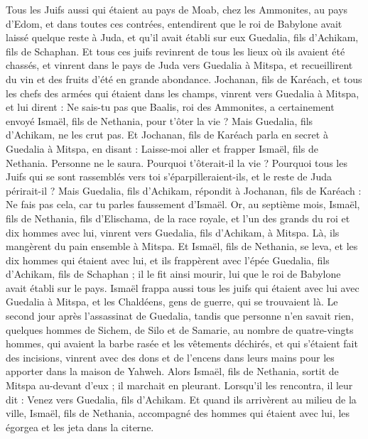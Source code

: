 \begin{multicols}{2}
Tous les Juifs aussi qui étaient au pays de Moab, chez les Ammonites, au pays d’Edom, et dans toutes ces contrées, entendirent que le roi de Babylone avait laissé quelque reste à Juda, et qu'il avait établi sur eux Guedalia, fils d'Achikam, fils de Schaphan.
Et tous ces juifs revinrent de tous les lieux où ils avaient été chassés, et vinrent dans le pays de Juda vers Guedalia à Mitspa, et recueillirent du vin et des fruits d’été en grande abondance.
Jochanan, fils de Karéach, et tous les chefs des armées qui étaient dans les champs, vinrent vers Guedalia à Mitspa,
et lui dirent : Ne sais-tu pas que Baalis, roi des Ammonites, a certainement envoyé Ismaël, fils de Nethania, pour t'ôter la vie ? Mais Guedalia, fils d'Achikam, ne les crut pas.
Et Jochanan, fils de Karéach parla en secret à Guedalia à Mitspa, en disant : Laisse-moi aller et frapper Ismaël, fils de Nethania. Personne ne le saura. Pourquoi t'ôterait-il la vie ? Pourquoi tous les Juifs qui se sont rassemblés vers toi s’éparpilleraient-ils, et le reste de Juda périrait-il ?
Mais Guedalia, fils d'Achikam, répondit à Jochanan, fils de Karéach : Ne fais pas cela, car tu parles faussement d'Ismaël.
\VerseOne{}Or, au septième mois, Ismaël, fils de Nethania, fils d'Elischama, de la race royale, et l'un des grands du roi et dix hommes avec lui, vinrent vers Guedalia, fils d'Achikam, à Mitspa. Là, ils mangèrent du pain ensemble à Mitspa.
Et Ismaël, fils de Nethania, se leva, et les dix hommes qui étaient avec lui, et ils frappèrent avec l'épée Guedalia, fils d'Achikam, fils de Schaphan ; il le fit ainsi mourir, lui que le roi de Babylone avait établi sur le pays.
Ismaël frappa aussi tous les juifs qui étaient avec lui avec Guedalia à Mitspa, et les Chaldéens, gens de guerre, qui se trouvaient là.
Le second jour après l’assassinat de Guedalia, tandis que personne n’en savait rien,
quelques hommes de Sichem, de Silo et de Samarie, au nombre de quatre-vingts hommes, qui avaient la barbe rasée et les vêtements déchirés, et qui s'étaient fait des incisions, vinrent avec des dons et de l'encens dans leurs mains pour les apporter dans la maison de Yahweh.
Alors Ismaël, fils de Nethania, sortit de Mitspa au-devant d'eux ; il marchait en pleurant. Lorsqu’il les rencontra, il leur dit : Venez vers Guedalia, fils d'Achikam.
Et quand ils arrivèrent au milieu de la ville, Ismaël, fils de Nethania, accompagné des hommes qui étaient avec lui, les égorgea et les jeta dans la citerne.

\end{multicols}
